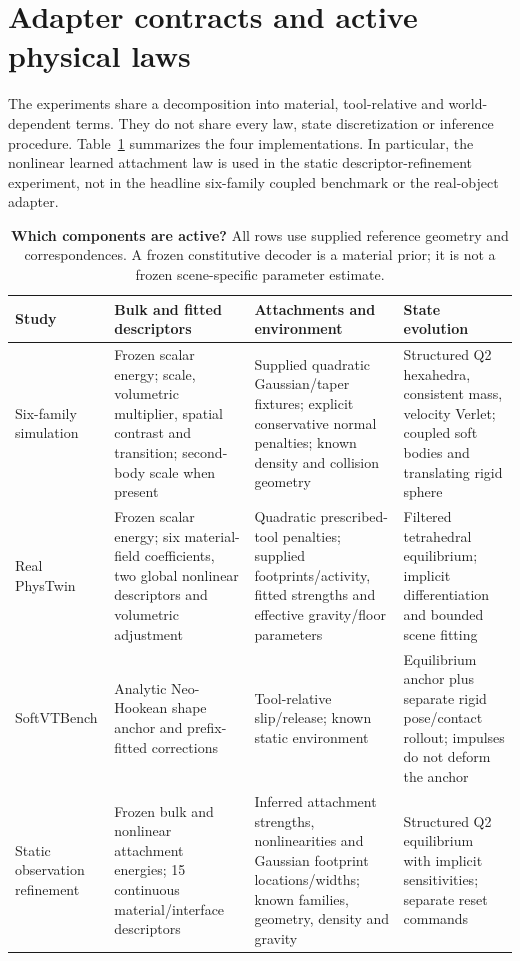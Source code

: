 \section{Adapter contracts and active physical laws}
\label{sec:adapter-contracts}
The experiments share a decomposition into material, tool-relative and
world-dependent terms. They do not share every law, state discretization or
inference procedure. Table~\ref{tab:adapter-contracts} summarizes the four
implementations. In particular, the nonlinear learned attachment law is used
in the static descriptor-refinement experiment, not in the headline six-family
coupled benchmark or the real-object adapter.

\begin{table}[t]
\centering\small\setlength{\tabcolsep}{4pt}
\caption{\textbf{Which components are active?} All rows use supplied reference
geometry and correspondences. A frozen constitutive decoder is a material
prior; it is not a frozen scene-specific parameter estimate.}
\label{tab:adapter-contracts}
\begin{tabular}{p{}p{}p{}p{}}
\toprule
Study & Bulk and fitted descriptors & Attachments and environment & State evolution\\
\midrule
Six-family simulation & Frozen scalar energy; scale, volumetric multiplier,
spatial contrast and transition; second-body scale when present & Supplied
quadratic Gaussian/taper fixtures; explicit conservative normal penalties;
known density and collision geometry & Structured Q2 hexahedra, consistent
mass, velocity Verlet; coupled soft bodies and translating rigid sphere\\
Real PhysTwin & Frozen scalar energy; six material-field coefficients,
two global nonlinear descriptors and volumetric adjustment & Quadratic
prescribed-tool penalties; supplied footprints/activity, fitted strengths
and effective gravity/floor parameters & Filtered tetrahedral equilibrium;
implicit differentiation and bounded scene fitting\\
SoftVTBench & Analytic Neo-Hookean shape anchor and prefix-fitted corrections
& Tool-relative slip/release; known static environment & Equilibrium anchor
plus separate rigid pose/contact rollout; impulses do not deform the anchor\\
Static observation refinement & Frozen bulk and nonlinear attachment
energies; 15 continuous material/interface descriptors & Inferred attachment
strengths, nonlinearities and Gaussian footprint locations/widths; known
families, geometry, density and gravity & Structured Q2 equilibrium with
implicit sensitivities; separate reset commands\\
\bottomrule
\end{tabular}
\end{table}

